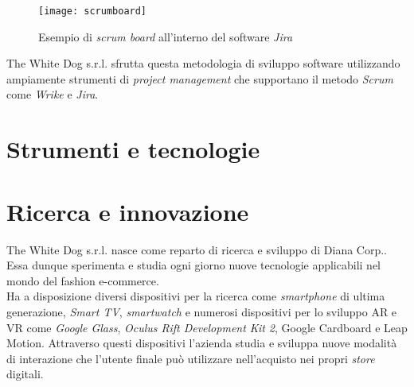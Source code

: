 \label{Scrum board}
\begin{figure}[ht]
	\begin{center}
		\texttt{[image: scrumboard]}
		\caption{Esempio di \textit{scrum board} all'interno del software \textit{Jira}}
	\end{center}
\end{figure}
\FloatBarrier

The White Dog s.r.l. sfrutta questa metodologia di sviluppo software utilizzando ampiamente strumenti di \textit{project management} che supportano il metodo \textit{Scrum} come \textit{Wrike} e \textit{Jira}.

\section{Strumenti e tecnologie}



\section{Ricerca e innovazione}

The White Dog s.r.l. nasce come reparto di ricerca e sviluppo di Diana Corp.. Essa dunque sperimenta e studia ogni giorno nuove tecnologie applicabili nel mondo del fashion e-commerce. \\
Ha a disposizione diversi dispositivi per la ricerca come \textit{smartphone} di ultima generazione, \textit{Smart TV}, \textit{smartwatch} e numerosi dispositivi per lo sviluppo AR e VR come \textit{Google Glass}, \textit{Oculus Rift Development Kit 2}, Google Cardboard e Leap Motion. Attraverso questi dispositivi l'azienda studia e sviluppa nuove modalità di interazione che l'utente finale può utilizzare nell'acquisto nei propri \textit{store} digitali.